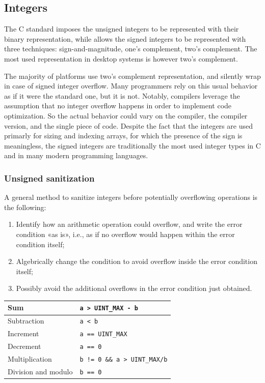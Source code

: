 \documentclass[a4paper,12pt]{article}
\begin{document}
\subsection{Integers}
The C standard imposes the unsigned integers to be represented with their binary representation, while allows the signed integers to be represented with three techniques: sign-and-magnitude, one’s complement, two’s complement. The most used representation in desktop systems is however two’s complement.

The majority of platforms use two’s complement representation, and silently wrap in case of signed integer overflow. Many programmers rely on this usual behavior as if it were the standard one, but it is not. Notably, compilers leverage the assumption that no integer overflow happens in order to implement code optimization. So the actual behavior could vary on the compiler, the compiler version, and the single piece of code.
Despite the fact that the integers are used primarly for sizing and indexing arrays, for which the presence of the sign is meaningless, the signed integers are traditionally the most used integer types in C and in many modern programming languages.

\subsubsection{Unsigned sanitization}
A general method to sanitize integers before potentially overflowing operations is the following:
\begin{enumerate}
	\item Identify how an arithmetic operation could overflow, and write the error condition «as is», i.e., as if no overflow would happen within the error condition itself;
	\item Algebrically change the condition to avoid overflow inside the error condition itself;
	\item Possibly avoid the additional overflows in the error condition just obtained.
\end{enumerate}

\begin{center}
\begin{tabular}{|l|l|}
\hline
Sum & \texttt{a > UINT\_MAX - b} \\
\hline
Subtraction & \texttt{a < b} \\
\hline
Increment & \texttt{a == UINT\_MAX} \\
\hline
Decrement & \texttt{a == 0} \\
\hline
Multiplication & \texttt{b != 0 \&\& a > UINT\_MAX/b} \\
\hline
Division and modulo & \texttt{b == 0} \\
\hline
\end{tabular}
\end{center}
\end{document}
